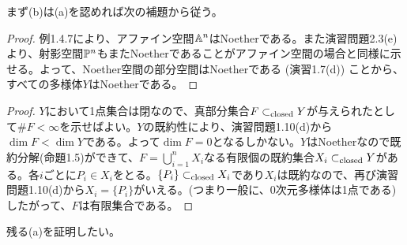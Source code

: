 まず(b)は(a)を認めれば次の補題から従う。
\begin{proof}
  例1.4.7により、アファイン空間$\A^n$はNoetherである。また演習問題2.3(e)より、射影空間$\P^n$もまたNoetherであることがアファイン空間の場合と同様に示せる。よって、Noether空間の部分空間はNoetherである (演習1.7(d)) ことから、すべての多様体$Y$はNoetherである。
\end{proof}
\begin{proof}
  $Y$において1点集合は閉なので、真部分集合$F \clsub Y$が与えられたとして$\# F < \infty$を示せばよい。$Y$の既約性により、演習問題1.10(d)から$\dim F < \dim Y$である。よって$\dim F = 0$となるしかない。$Y$はNoetherなので既約分解(命題1.5)ができて、$F = \bigcup_{i=1}^n X_i$なる有限個の既約集合$X_i \clsub Y$がある。各$i$ごとに$P_i \in  X_i$をとる。$\{ P_i \} \clsub X_i$であり$X_i$は既約なので、再び演習問題1.10(d)から$X_i = \{ P_i\}$がいえる。(つまり一般に、0次元多様体は1点である)
  したがって、$F$は有限集合である。
\end{proof}
残る(a)を証明したい。
